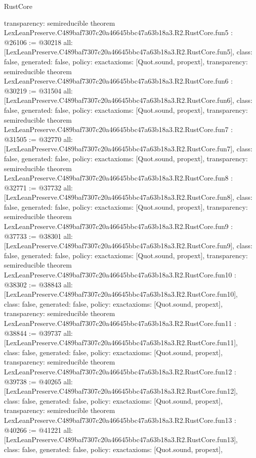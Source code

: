 \begin{lexlean}{RustCore}
\begin{coremodule}
{  transparency: semireducible
}
theorem LexLeanPreserve.C489baf7307c20a46645bbc47a63b18a3.R2.RustCore.fun5 : @26106 := @30218 {
  all: [LexLeanPreserve.C489baf7307c20a46645bbc47a63b18a3.R2.RustCore.fun5],
  class: false,
  generated: false,
  policy: exact{axioms: [Quot.sound, propext]},
  transparency: semireducible
}
theorem LexLeanPreserve.C489baf7307c20a46645bbc47a63b18a3.R2.RustCore.fun6 : @30219 := @31504 {
  all: [LexLeanPreserve.C489baf7307c20a46645bbc47a63b18a3.R2.RustCore.fun6],
  class: false,
  generated: false,
  policy: exact{axioms: [Quot.sound, propext]},
  transparency: semireducible
}
theorem LexLeanPreserve.C489baf7307c20a46645bbc47a63b18a3.R2.RustCore.fun7 : @31505 := @32770 {
  all: [LexLeanPreserve.C489baf7307c20a46645bbc47a63b18a3.R2.RustCore.fun7],
  class: false,
  generated: false,
  policy: exact{axioms: [Quot.sound, propext]},
  transparency: semireducible
}
theorem LexLeanPreserve.C489baf7307c20a46645bbc47a63b18a3.R2.RustCore.fun8 : @32771 := @37732 {
  all: [LexLeanPreserve.C489baf7307c20a46645bbc47a63b18a3.R2.RustCore.fun8],
  class: false,
  generated: false,
  policy: exact{axioms: [Quot.sound, propext]},
  transparency: semireducible
}
theorem LexLeanPreserve.C489baf7307c20a46645bbc47a63b18a3.R2.RustCore.fun9 : @37733 := @38301 {
  all: [LexLeanPreserve.C489baf7307c20a46645bbc47a63b18a3.R2.RustCore.fun9],
  class: false,
  generated: false,
  policy: exact{axioms: [Quot.sound, propext]},
  transparency: semireducible
}
theorem LexLeanPreserve.C489baf7307c20a46645bbc47a63b18a3.R2.RustCore.fun10 : @38302 := @38843 {
  all: [LexLeanPreserve.C489baf7307c20a46645bbc47a63b18a3.R2.RustCore.fun10],
  class: false,
  generated: false,
  policy: exact{axioms: [Quot.sound, propext]},
  transparency: semireducible
}
theorem LexLeanPreserve.C489baf7307c20a46645bbc47a63b18a3.R2.RustCore.fun11 : @38844 := @39737 {
  all: [LexLeanPreserve.C489baf7307c20a46645bbc47a63b18a3.R2.RustCore.fun11],
  class: false,
  generated: false,
  policy: exact{axioms: [Quot.sound, propext]},
  transparency: semireducible
}
theorem LexLeanPreserve.C489baf7307c20a46645bbc47a63b18a3.R2.RustCore.fun12 : @39738 := @40265 {
  all: [LexLeanPreserve.C489baf7307c20a46645bbc47a63b18a3.R2.RustCore.fun12],
  class: false,
  generated: false,
  policy: exact{axioms: [Quot.sound, propext]},
  transparency: semireducible
}
theorem LexLeanPreserve.C489baf7307c20a46645bbc47a63b18a3.R2.RustCore.fun13 : @40266 := @41221 {
  all: [LexLeanPreserve.C489baf7307c20a46645bbc47a63b18a3.R2.RustCore.fun13],
  class: false,
  generated: false,
  policy: exact{axioms: [Quot.sound, propext]},
}
\end{coremodule}
\end{lexlean}
